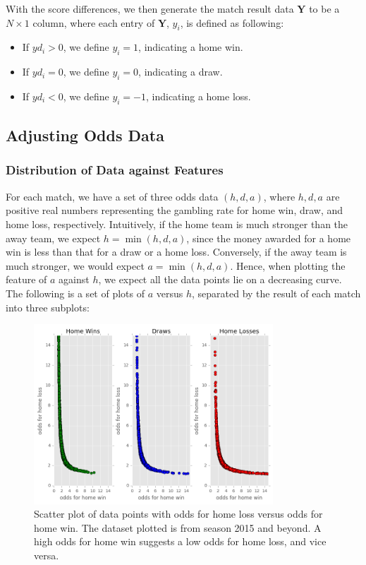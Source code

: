 \documentclass{article}
\begin{document}
	With the score differences, we then generate the match result data $\mathbf{Y}$ to be a $N \times 1$ column, where each entry of $\mathbf{Y}$, $y_i$, is defined as following:
	\begin{itemize}
		\item If $yd_i > 0$, we define  $y_i = 1$, indicating a home win.
		\item If $yd_i = 0$, we define $y_i = 0$, indicating a draw.
		\item If $yd_i < 0$, we define $y_i = -1$, indicating a home loss.
	\end{itemize}
	
	\subsection{Adjusting Odds Data}
	\subsubsection{Distribution of Data against Features}
	
	For each match, we have a set of three odds data $(h, d, a)$, where $h, d, a$ are positive real numbers representing the gambling rate for home win, draw, and home loss, respectively. Intuitively, if the home team is much stronger than the away team, we expect $h = \min(h, d, a)$, since the money awarded for a home win is less than that for a draw or a home loss. Conversely, if the away team is much stronger, we would expect $a = \min(h, d, a)$. Hence, when plotting the feature of $a$ against $h$, we expect all the data points lie on a decreasing curve. The following is a set of plots of $a$ versus $h$, separated by the result of each match into three subplots:
	\begin{figure}[!ht]
		\centering
		\label{2d_figure}
		\includegraphics[width=0.8\textwidth]{2D_15.png}
		\caption{Scatter plot of data points with odds for home loss versus odds for home win. The dataset plotted is from season 2015 and beyond. A high odds for home win suggests a low odds for home loss, and vice versa.}
	\end{figure}
	
\end{document}
